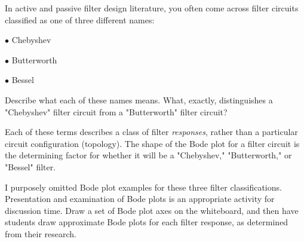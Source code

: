 

In active and passive filter design literature, you often come across filter circuits classified as one of three different names:

\medskip
\item{$\bullet$} Chebyshev
\item{$\bullet$} Butterworth
\item{$\bullet$} Bessel
\medskip

Describe what each of these names means.  What, exactly, distinguishes a "Chebyshev" filter circuit from a "Butterworth" filter circuit?







Each of these terms describes a class of filter {\it responses}, rather than a particular circuit configuration (topology).  The shape of the Bode plot for a filter circuit is the determining factor for whether it will be a "Chebyshev," "Butterworth," or "Bessel" filter.







I purposely omitted Bode plot examples for these three filter classifications.  Presentation and examination of Bode plots is an appropriate activity for discussion time.  Draw a set of Bode plot axes on the whiteboard, and then have students draw approximate Bode plots for each filter response, as determined from their research.




